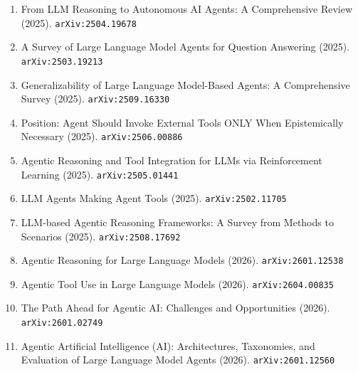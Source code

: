 \documentclass[11pt]{article}
\begin{document}
\begin{enumerate}
  \item From LLM Reasoning to Autonomous AI Agents: A Comprehensive Review (2025). \texttt{arXiv:2504.19678}
  \item A Survey of Large Language Model Agents for Question Answering (2025). \texttt{arXiv:2503.19213}
  \item Generalizability of Large Language Model-Based Agents: A Comprehensive Survey (2025). \texttt{arXiv:2509.16330}
  \item Position: Agent Should Invoke External Tools ONLY When Epistemically Necessary (2025). \texttt{arXiv:2506.00886}
  \item Agentic Reasoning and Tool Integration for LLMs via Reinforcement
  Learning (2025). \texttt{arXiv:2505.01441}
  \item LLM Agents Making Agent Tools (2025). \texttt{arXiv:2502.11705}
  \item LLM-based Agentic Reasoning Frameworks: A Survey from Methods to Scenarios (2025). \texttt{arXiv:2508.17692}
  \item Agentic Reasoning for Large Language Models (2026). \texttt{arXiv:2601.12538}
  \item Agentic Tool Use in Large Language Models (2026). \texttt{arXiv:2604.00835}
  \item The Path Ahead for Agentic AI: Challenges and Opportunities (2026). \texttt{arXiv:2601.02749}
  \item Agentic Artificial Intelligence (AI): Architectures, Taxonomies, and Evaluation of Large Language Model Agents (2026). \texttt{arXiv:2601.12560}
\end{enumerate}
\end{document}
